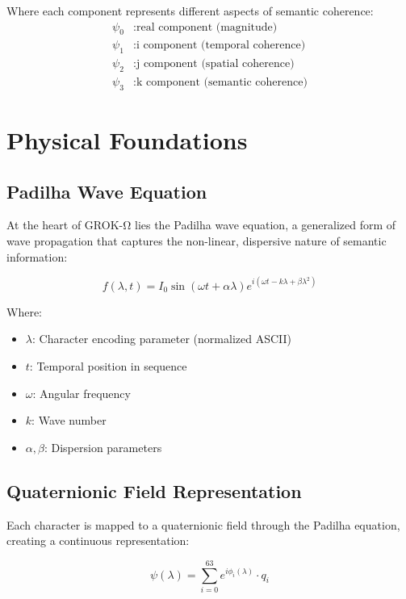 \documentclass[11pt,a4paper]{article}
\begin{document}
Where each component represents different aspects of semantic coherence:
\begin{align}
\psi_0 &: \text{real component (magnitude)} \\
\psi_1 &: \text{i component (temporal coherence)} \\
\psi_2 &: \text{j component (spatial coherence)} \\
\psi_3 &: \text{k component (semantic coherence)}
\end{align}

\section{Physical Foundations}

\subsection{Padilha Wave Equation}

At the heart of GROK-Ω lies the Padilha wave equation, a generalized form of wave propagation that captures the non-linear, dispersive nature of semantic information:

\begin{equation}
f(\lambda,t) = I_0 \sin(\omega t + \alpha \lambda) e^{i(\omega t - k\lambda + \beta \lambda^2)}
\label{eq:padilha}
\end{equation}

Where:
\begin{itemize}
\item $\lambda$: Character encoding parameter (normalized ASCII)
\item $t$: Temporal position in sequence
\item $\omega$: Angular frequency
\item $k$: Wave number
\item $\alpha, \beta$: Dispersion parameters
\end{itemize}

\subsection{Quaternionic Field Representation}

Each character is mapped to a quaternionic field through the Padilha equation, creating a continuous representation:

\begin{equation}
\psi(\lambda) = \sum_{i=0}^{63} e^{i\phi_i(\lambda)} \cdot q_i
\end{equation}
\end{document}
